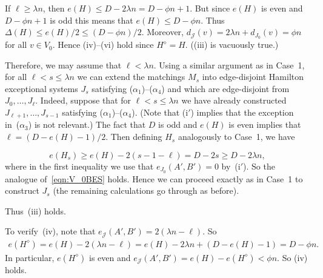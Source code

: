 \documentclass{memo-l}
\def\COMMENT#1{}
\numberwithin{section}{chapter}
\numberwithin{equation}{section}
\numberwithin{firstthm}{section}
\numberwithin{figure}{section}
\begin{document}
If $\ell \ge \lambda n $, then $e(H) \le D - 2\lambda n  = D - \phi n+1$. But since $e(H)$ is even and $D - \phi n+1$ is odd this
means that $e(H) \le D - \phi n$. Thus $\Delta(H) \le e(H) /2 \le (D- \phi n ) /2$.
Moreover, $d_{\mathcal J}(v)=2 \lambda n+ d_{J_0}(v)= \phi n$ for all $v \in V_0$.
Hence (iv)--(vi) hold since $H^{\diamond} = H$. ((iii) is vacuously true.)

Therefore, we may assume that $\ell < \lambda n$. 
Using a similar argument as in Case~1, for all $\ell < s \le \lambda n$ we can extend the matchings $M_s$
into edge-disjoint Hamilton exceptional systems $J_s$ satisfying ($\alpha_1$)--($\alpha_4$) and which are edge-disjoint from $J_0,\dots,J_\ell$. 
Indeed, suppose that for $\ell < s\le \lambda n$ we have already constructed $J_{\ell+1}, \dots ,J_{s-1}$ satisfying ($\alpha_1$)--($\alpha_4$). 
(Note that (i$'$) implies that the exception in~($\alpha_3$) is not relevant.) The fact that $D$ is odd and $e(H)$ is even implies that $\ell=(D-e(H)-1)/2$.
Then defining $H_s$ analogously to Case~1, we have%
   \COMMENT{Daniela: previously had $e(H_s)  \ge e(H) - 2(s-1-\ell)-1$ below, deleted the $-1$ and added some detail after the display}
$$ 
e(H_s)  \ge e(H) - 2(s-1-\ell) = D - 2s  \ge D-2 \lambda n,
$$
where in the first inequality we use that $e_{J_0}(A',B')=0$ by~(i$'$).
So the analogue of~\eqref{eqn:V_0BES} holds. 
Hence we can proceed exactly as in Case~1 to construct $J_s$ (the remaining calculations go through as before).%
\COMMENT{Deryk: previously had `are changed slightly but not significantly 
by the removal of the matching exceptional systems from $G$).' but I don't see the difference}
Thus~(iii) holds.

To verify~(iv), 
note that $e_{\mathcal{J}}(A',B') = 2(\lambda n - \ell )$. So
\begin{align}
e(H^{\diamond}) = e(H) - 2(\lambda n - \ell ) = e(H) - 2 \lambda n + (D- e(H)-1)  = D - \phi n \label{eqn:eHdia}.
\end{align}
In particular, $e(H^{\diamond})$ is even and $e_\mathcal{J}(A',B')=e(H)-e(H^{\diamond})<\phi n$. So (iv) holds.
\end{document}
